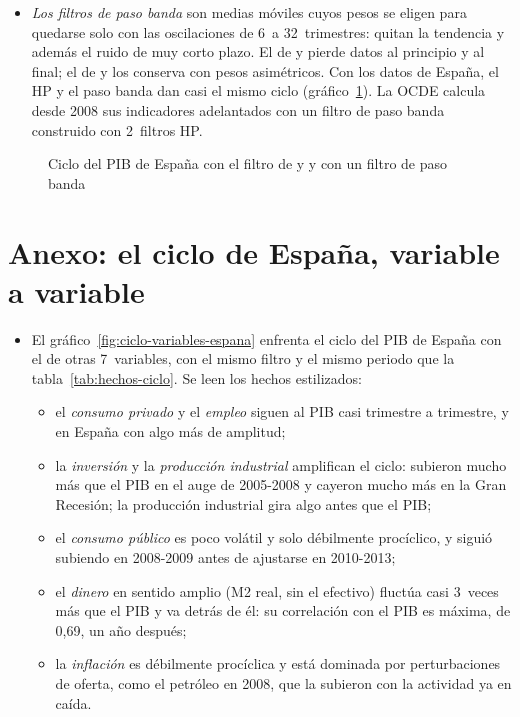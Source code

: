 \documentclass[11pt]{article}
\begin{document}
\begin{itemize}
\item \emph{Los filtros de paso banda}\nocite{BaxterKing1999Measuring,ChristianoFitzgerald2003Band} son medias móviles cuyos pesos se eligen para quedarse solo con las oscilaciones de 6~a 32~trimestres: quitan la tendencia y además el ruido de muy corto plazo. El de  y  pierde datos al principio y al final; el de  y  los conserva con pesos asimétricos. Con los datos de España, el HP y el paso banda dan casi el mismo ciclo (gráfico~\ref{fig:hp-paso-banda}). La OCDE calcula desde 2008 sus indicadores adelantados con un filtro de paso banda construido con 2~filtros HP\nocite{Yamada2011Note}.
\end{itemize}

\begin{figure}[H]
\centering
\caption{Ciclo del PIB de España con el filtro de  y  y con un filtro de paso banda}\label{fig:hp-paso-banda}
\end{figure}

\section{Anexo: el ciclo de España, variable a variable}\label{anexo:ciclo-espana}

\begin{itemize}
\item El gráfico~\ref{fig:ciclo-variables-espana} enfrenta el ciclo del PIB de España con el de otras 7~variables, con el mismo filtro y el mismo periodo que la tabla~\ref{tab:hechos-ciclo}. Se leen los hechos estilizados:
  \begin{itemize}
  \item el \emph{consumo privado} y el \emph{empleo} siguen al PIB casi trimestre a trimestre, y en España con algo más de amplitud;
  \item la \emph{inversión} y la \emph{producción industrial} amplifican el ciclo: subieron mucho más que el PIB en el auge de 2005-2008 y cayeron mucho más en la Gran Recesión; la producción industrial gira algo antes que el PIB;
  \item el \emph{consumo público} es poco volátil y solo débilmente procíclico, y siguió subiendo en 2008-2009 antes de ajustarse en 2010-2013\nocite{Eurostat2026namq10gdp};
  \item el \emph{dinero} en sentido amplio (M2 real, sin el efectivo) fluctúa casi 3~veces más que el PIB y va detrás de él: su correlación con el PIB es máxima, de 0,69, un año después;
  \item la \emph{inflación} es débilmente procíclica y está dominada por perturbaciones de oferta, como el petróleo en 2008, que la subieron con la actividad ya en caída.
  \end{itemize}
\end{itemize}
\end{document}
